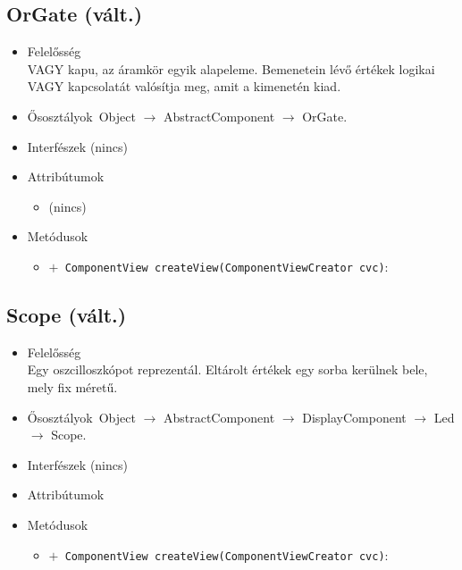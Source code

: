 \subsection{OrGate (vált.)}
\begin{itemize}
\item Felelősség\\
VAGY kapu, az áramkör egyik alapeleme. Bemenetein lévő értékek logikai VAGY kapcsolatát  valósítja meg, amit a kimenetén kiad.
\item Ősosztályok\ Object $\rightarrow{}$ AbstractComponent $\rightarrow{}$ OrGate.
\item Interfészek (nincs)
\item Attribútumok $\ $
\begin{itemize}
\item (nincs)
\end{itemize}
\item Metódusok$\ $
\begin{itemize}
	\item[] \texttt{$+$ ComponentView createView(ComponentViewCreator cvc)}: 
\end{itemize}
\end{itemize}

\subsection{Scope (vált.)}
\begin{itemize}
\item Felelősség\\
Egy oszcilloszkópot reprezentál. Eltárolt értékek egy sorba kerülnek bele, mely fix méretű.
\item Ősosztályok\ Object $\rightarrow{}$ AbstractComponent $\rightarrow{}$ DisplayComponent $\rightarrow{}$ Led $\rightarrow{}$ Scope.
\item Interfészek (nincs)
\item Attribútumok $\ $
\item Metódusok$\ $
\begin{itemize}
	\item[] \texttt{$+$ ComponentView createView(ComponentViewCreator cvc)}: 
\end{itemize}
\end{itemize}

